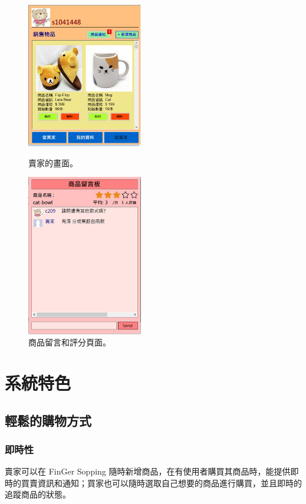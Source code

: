 \documentclass{scrreprt}
\begin{document}
\begin{CJK}{UTF8}{bkai}
\begin{figure}[t]
	\centering
	\includegraphics[width=0.45\textwidth]{note.jpg}
	\caption{賣家的畫面。}
	\centering
	\includegraphics[width=0.45\textwidth]{star.jpg}
	\caption{商品留言和評分頁面。}
\end{figure}


\chapter{系統特色}
\section{輕鬆的購物方式}

\subsection{即時性}
\qquad 賣家可以在 FinGer Sopping 隨時新增商品，在有使用者購買其商品時，能提供即時的買賣資訊和通知；買家也可以隨時選取自己想要的商品進行購買，並且即時的追蹤商品的狀態。


\end{CJK}
\end{document}
